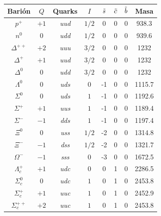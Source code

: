 \begin{table}[h]
    \centering
\begin{tabular}{|c|c|c|c|c|c|c|c|}
\hline
Barión            & $Q$  & Quarks       & $I$    & $\Tilde{s}$ & $\Tilde{c}$ & $\Tilde{b}$ & Masa   \\ \hline
$p^{+}$           & $+1$ & \textit{uud} & $1/2$  & 0           & 0           & 0           & 938.3  \\
$n^{0}$           & $0$  & \textit{udd} & $1/2$  & 0           & 0           & 0           & 939.6  \\
$\Delta^{++}$     & $+2$ & \textit{uuu} & $3/2$  & 0           & 0           & 0           & 1232   \\
$\Delta^{+}$      & $+1$ & \textit{uud} & $3/2$  & 0           & 0           & 0           & 1232   \\
$\Delta^{0}$      & $0$  & \textit{udd} & $3/2$  & 0           & 0           & 0           & 1232   \\  \hline \hline
$\Lambda^{0}$     & $0$  & \textit{uds} & $0$    & -1          & 0           & 0           & 1115.7 \\
$\Sigma^{0}$      & $0$  & \textit{uds} & $1$    & -1          & 0           & 0           & 1192.6 \\
$\Sigma^{+}$      & $+1$ & \textit{uus} & $1$    & -1          & 0           & 0           & 1189.4 \\
$\Sigma^{-}$      & $-1$ & \textit{dds} & $1$    & -1          & 0           & 0           & 1197.4 \\
$\Xi^{0}$         & $0$  & \textit{uss} & $1/2$  & -2          & 0           & 0           & 1314.8 \\
$\Xi^{-}$         & $-1$ & \textit{dss} & $1/2$  & -2          & 0           & 0           & 1321.7 \\
$\Omega^{-}$      & $-1$ & \textit{sss} & $0$    & -3          & 0           & 0           & 1672.5 \\ \hline \hline
$\Lambda_{c}^{+}$ & $+1$ & \textit{udc} & $0$    & 0           & 1           & 0           & 2286.5 \\
$\Sigma_{c}^{0}$  & $0$  & \textit{udc} & $1$    & 0           & 1           & 0           & 2453.8 \\
$\Sigma_{c}^{+}$  & $+1$ & \textit{uuc} & $1$    & 0           & 1           & 0           & 2452.9 \\
$\Sigma_{c}^{++}$ & $+2$ & \textit{uuc} & $1$    & 0           & 1           & 0           & 2453.8 \\

\end{tabular}
\end{table}

